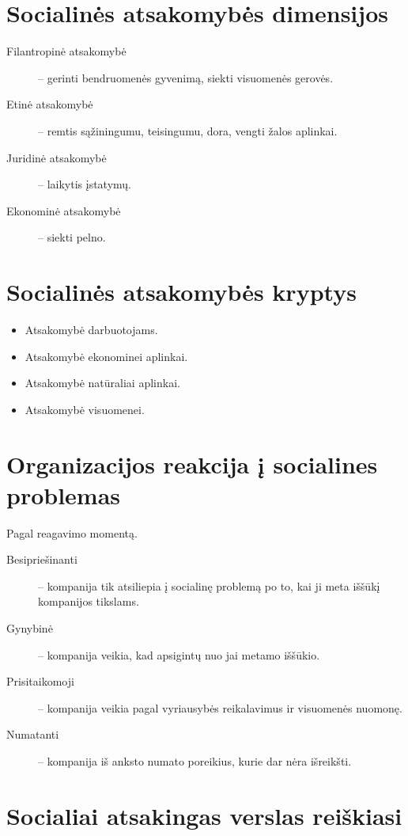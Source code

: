 \section{Socialinės atsakomybės dimensijos}

\begin{description}
  \item[Filantropinė atsakomybė] – gerinti bendruomenės gyvenimą, siekti
    visuomenės gerovės.
  \item[Etinė atsakomybė] – remtis sąžiningumu, teisingumu, dora, vengti
    žalos aplinkai.
  \item[Juridinė atsakomybė] – laikytis įstatymų.
  \item[Ekonominė atsakomybė] – siekti pelno.
\end{description}

\section{Socialinės atsakomybės kryptys}

\begin{itemize}
  \item Atsakomybė darbuotojams.
  \item Atsakomybė ekonominei aplinkai.
  \item Atsakomybė natūraliai aplinkai.
  \item Atsakomybė visuomenei.
\end{itemize}

\section{Organizacijos reakcija į socialines problemas}

Pagal reagavimo momentą.

\begin{description}
  \item[Besipriešinanti] – kompanija tik atsiliepia į socialinę problemą
    po to, kai ji meta iššūkį kompanijos tikslams.
  \item[Gynybinė] – kompanija veikia, kad apsigintų nuo jai metamo
    iššūkio.
  \item[Prisitaikomoji] – kompanija veikia pagal vyriausybės reikalavimus
    ir visuomenės nuomonę.
  \item[Numatanti] – kompanija iš anksto numato poreikius, kurie dar nėra
    išreikšti.
\end{description}

\section{Socialiai atsakingas verslas reiškiasi}

